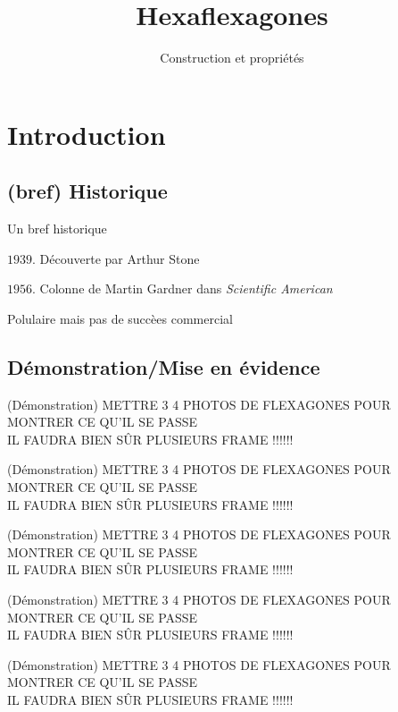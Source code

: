 \documentclass[french,xcolor=dvipsnames]{beamer}
\begin{document}
	\title{Hexaflexagones}
	\subtitle{Construction et propriétés}
	\frame[plain]{\maketitle}
	

\AtBeginSection
{
}

	
	\section{Introduction}
		\subsection{(bref) Historique}
		\begin{frame}{Un bref historique}

			\begin{list}{Intro}{}
				\item[$\textit{1939}$.] Découverte  par Arthur Stone
				\item[$\textit{1956}$.]Colonne de Martin Gardner dans \textit{Scientific American}
				\item[Polulaire mais pas de succèes commercial]
			\end{list}
		\end{frame}
		
		\subsection{Démonstration/Mise en évidence}
		\begin{frame}{(Démonstration)}
			METTRE 3 4 PHOTOS DE FLEXAGONES POUR MONTRER CE QU'IL SE PASSE\\
			IL FAUDRA BIEN SÛR PLUSIEURS FRAME !!!!!!
		\end{frame}
		\begin{frame}{(Démonstration)}
			METTRE 3 4 PHOTOS DE FLEXAGONES POUR MONTRER CE QU'IL SE PASSE\\
			IL FAUDRA BIEN SÛR PLUSIEURS FRAME !!!!!!
		\end{frame}
		\begin{frame}{(Démonstration)}
			METTRE 3 4 PHOTOS DE FLEXAGONES POUR MONTRER CE QU'IL SE PASSE\\
			IL FAUDRA BIEN SÛR PLUSIEURS FRAME !!!!!!
		\end{frame}
		\begin{frame}{(Démonstration)}
			METTRE 3 4 PHOTOS DE FLEXAGONES POUR MONTRER CE QU'IL SE PASSE\\
			IL FAUDRA BIEN SÛR PLUSIEURS FRAME !!!!!!
		\end{frame}
		\begin{frame}{(Démonstration)}
			METTRE 3 4 PHOTOS DE FLEXAGONES POUR MONTRER CE QU'IL SE PASSE\\
			IL FAUDRA BIEN SÛR PLUSIEURS FRAME !!!!!!
		\end{frame}
		
\end{document}
